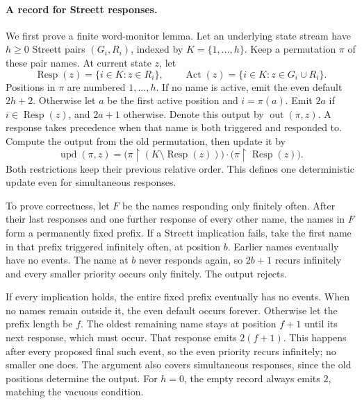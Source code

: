 \paragraph{A record for Streett responses.}
\label{sec:p09-streett-response-record}
We first prove a
finite word-monitor lemma.
Let an underlying state
stream have \(h\geq0\)
Streett pairs
\((G_i,R_i)\), indexed
by \(K=\{1,\ldots,h\}\).
Keep a permutation \(\pi\)
of these pair names.
At current state \(z\),
let
\[
 \operatorname{Resp}(z)=\{i\in K:z\in R_i\},\qquad
 \operatorname{Act}(z)=\{i\in K:z\in G_i\cup R_i\}.
\]
Positions in \(\pi\)
are numbered \(1,\ldots,h\).
If no name is active,
emit the even default
\(2h+2\).
Otherwise let \(a\)
be the first active
position and \(i=\pi(a)\).
Emit \(2a\) if
\(i\in\operatorname{Resp}(z)\),
and \(2a+1\) otherwise.
Denote this output by
\(\operatorname{out}(\pi,z)\).
A response takes precedence
when that name is
both triggered and
responded to.
Compute the output from
the old permutation,
then update it by
\[
 \operatorname{upd}(\pi,z)=
 \bigl(\pi\upharpoonright(K\setminus\operatorname{Resp}(z))\bigr)
 \mathbin{\cdot}
 \bigl(\pi\upharpoonright\operatorname{Resp}(z)\bigr).
\]
Both restrictions keep
their previous relative
order. This defines
one deterministic update
even for simultaneous
responses.

To prove correctness,
let \(F\) be the
names responding only
finitely often.
After their last responses
and one further response
of every other name,
the names in \(F\)
form a permanently
fixed prefix.
If a Streett implication
fails, take the first
name in that prefix
triggered infinitely often,
at position \(b\).
Earlier names eventually
have no events.
The name at \(b\)
never responds again,
so \(2b+1\) recurs
infinitely and every
smaller priority occurs
only finitely.
The output rejects.

If every implication
holds, the entire
fixed prefix eventually
has no events.
When no names remain
outside it, the even
default occurs forever.
Otherwise let the prefix
length be \(f\).
The oldest remaining
name stays at position
\(f+1\) until its
next response, which
must occur.
That response emits
\(2(f+1)\).
This happens after
every proposed final
such event, so the
even priority recurs
infinitely; no smaller
one does. The argument
also covers simultaneous
responses, since the
old positions determine
the output.
For \(h=0\), the
empty record always
emits \(2\), matching
the vacuous condition.

